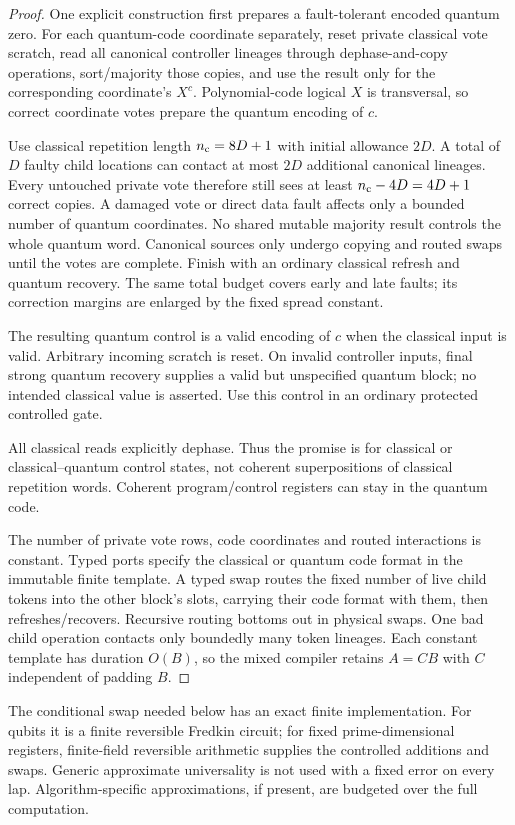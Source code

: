 \documentclass[11pt]{article}
\begin{document}
\begin{proof}
One explicit construction first prepares a fault-tolerant encoded
quantum zero. For each quantum-code coordinate separately, reset private
classical vote scratch, read all canonical controller lineages through
dephase-and-copy operations, sort/majority those copies, and use the
result only for the corresponding coordinate's $X^c$. Polynomial-code
logical $X$ is transversal, so correct coordinate votes prepare the
quantum encoding of $c$.

Use classical repetition length $n_{\rm c}=8D+1$ with initial allowance
$2D$. A total of $D$ faulty child locations can contact at most $2D$
additional canonical lineages. Every untouched private vote therefore
still sees at least $n_{\rm c}-4D=4D+1$ correct copies. A damaged vote or
direct data fault affects only a bounded number of quantum coordinates.
No shared mutable majority result controls the whole quantum word.
Canonical sources only undergo copying and routed swaps until the votes
are complete. Finish with an ordinary classical refresh and quantum
recovery. The same total budget covers early and late faults; its
correction margins are enlarged by the fixed spread constant.

The resulting quantum control is a valid encoding of $c$ when the
classical input is valid. Arbitrary incoming scratch is reset. On invalid
controller inputs, final strong quantum recovery supplies a valid but
unspecified quantum block; no intended classical value is asserted.
Use this control in an ordinary protected controlled gate.

All classical reads explicitly dephase. Thus the promise is for classical
or classical--quantum control states, not coherent superpositions of
classical repetition words. Coherent program/control registers can stay
in the quantum code.

The number of private vote rows, code coordinates and routed interactions
is constant. Typed ports specify the classical or quantum code format
in the immutable finite template. A typed swap routes the fixed number
of live child tokens into the other block's slots, carrying their code
format with them, then refreshes/recovers. Recursive routing bottoms out
in physical swaps. One bad child operation contacts only boundedly many
token lineages. Each constant template has duration $O(B)$, so the mixed
compiler retains $A=CB$ with $C$ independent of padding $B$.
\end{proof}

The conditional swap needed below has an exact finite implementation.
For qubits it is a finite reversible Fredkin circuit; for fixed
prime-dimensional registers, finite-field reversible arithmetic supplies
the controlled additions and swaps. Generic approximate universality is
not used with a fixed error on every lap. Algorithm-specific
approximations, if present, are budgeted over the full computation.
\end{document}

